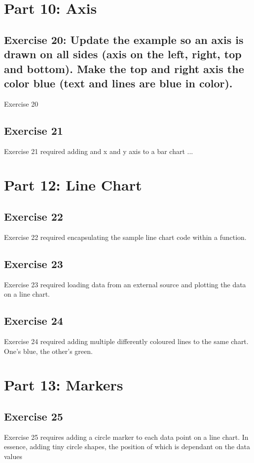 \documentclass[11pt]{article}   	%
\begin{document}
\section{Part 10: Axis}
\subsection{Exercise 20: Update the example so an axis is drawn on all sides (axis on the left, right, top and bottom). Make the top and right axis the color blue (text and lines are blue in color).}
Exercise 20

\subsection{Exercise 21 }
Exercise 21 required adding and x and y axis to a bar chart ...


\section{Part 12: Line Chart }
\subsection{ Exercise 22 }
Exercise 22 required encapsulating the sample line chart code within a function.

\subsection{Exercise 23 }
Exercise 23 required loading data from an external source and plotting the data on a line chart.

\subsection{ Exercise 24 }
Exercise 24 required adding multiple differently coloured lines to the same chart. One's blue, the other's green. 

\section{Part 13: Markers}
\subsection{Exercise 25 }
Exercise 25 requires adding a circle marker to each data point on a line chart. In essence, adding tiny circle shapes, the position of which is dependant on the data values 
\end{document}
